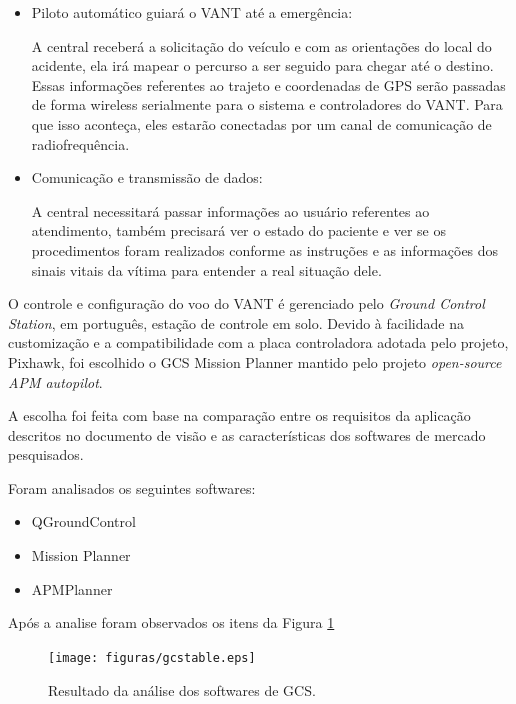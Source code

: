 \begin{itemize}
 \item Piloto automático guiará o VANT até a emergência: 

  A central receberá a solicitação do veículo e com as orientações do local do acidente, ela irá mapear o percurso a ser seguido para chegar até o destino.  Essas informações referentes ao trajeto e coordenadas de GPS serão passadas de forma wireless serialmente para o sistema e controladores do VANT. Para que isso aconteça, eles estarão conectadas por um canal de comunicação de radiofrequência. 

  \item Comunicação e transmissão de dados:

   A central necessitará passar informações ao usuário referentes ao atendimento, também precisará ver o estado do paciente e ver se os procedimentos foram realizados conforme as instruções e as informações dos sinais vitais da vítima para entender a real situação dele. 

\end{itemize}

O controle e configura\c{c}\~ao do voo do VANT \'e gerenciado pelo \textit{Ground Control Station}, em português, 
esta\c{c}\~ao de controle em solo. Devido à facilidade na customização e a compatibilidade com a placa controladora adotada pelo projeto, Pixhawk, foi escolhido o GCS Mission Planner mantido pelo projeto \textit{open-source  APM autopilot}.\cite{gcs}

A escolha foi feita com base na comparação entre os requisitos da aplicação descritos no documento de visão e as características dos softwares de mercado pesquisados.

Foram analisados os seguintes softwares: 

\begin{itemize}
  \item QGroundControl
  \item Mission Planner
  \item APMPlanner
\end{itemize}

Após a analise foram observados os itens da Figura \ref{fig:gcstable}

\begin{figure}[H]
    \centering
      \texttt{[image: figuras/gcstable.eps]}
    \caption{Resultado da análise dos softwares de GCS.}
    \label{fig:gcstable}
\end{figure}

